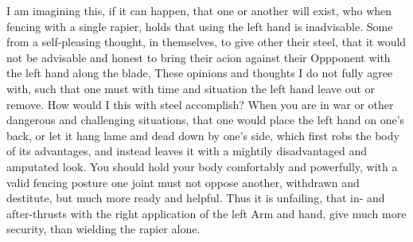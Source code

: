 I am imagining this, if it can happen, that one or another will exist,
who when fencing with a single rapier, holds that using the left hand
is inadvisable. Some from a self-pleasing thought, in themselves, to
give other their steel, that it would not be advisable and honest to
bring their acion against their Oppponent with the left hand along the
blade,
These opinions and thoughts I do not fully agree with, such that one
must with time and situation the left hand leave out or remove. How
would I this with steel accomplish? When you are in war or other
dangerous and challenging situations, that one would place the left
hand on one's back, or let it hang lame and dead down by one's side,
which first robs the body of its advantages, and instead leaves it
with a mightily disadvantaged and amputated look.
You should hold your body comfortably and powerfully, with a valid
fencing posture one joint must not oppose another, withdrawn and
destitute, but much more ready and helpful. Thus it is unfailing, that
in- and after-thrusts with the right application of the left Arm and
hand, give much more security, than wielding the rapier alone.
